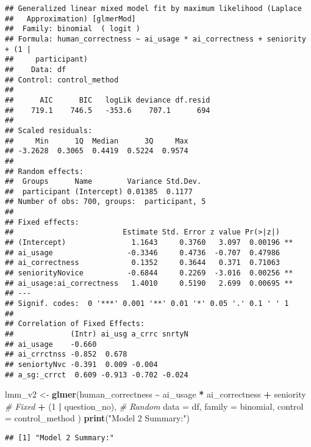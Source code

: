 \documentclass[
]{article}
\newenvironment{Shaded}{\begin{snugshade}}{\end{snugshade}}
\newcommand{\AttributeTok}[1]{\textcolor[rgb]{0.13,0.29,0.53}{#1}}
\newcommand{\CommentTok}[1]{\textcolor[rgb]{0.56,0.35,0.01}{\textit{#1}}}
\newcommand{\DecValTok}[1]{\textcolor[rgb]{0.00,0.00,0.81}{#1}}
\newcommand{\FunctionTok}[1]{\textcolor[rgb]{0.13,0.29,0.53}{\textbf{#1}}}
\newcommand{\NormalTok}[1]{#1}
\newcommand{\OtherTok}[1]{\textcolor[rgb]{0.56,0.35,0.01}{#1}}
\newcommand{\SpecialCharTok}[1]{\textcolor[rgb]{0.81,0.36,0.00}{\textbf{#1}}}
\newcommand{\StringTok}[1]{\textcolor[rgb]{0.31,0.60,0.02}{#1}}
\begin{document}
\begin{verbatim}
## Generalized linear mixed model fit by maximum likelihood (Laplace
##   Approximation) [glmerMod]
##  Family: binomial  ( logit )
## Formula: human_correctness ~ ai_usage * ai_correctness + seniority + (1 |  
##     participant)
##    Data: df
## Control: control_method
## 
##      AIC      BIC   logLik deviance df.resid 
##    719.1    746.5   -353.6    707.1      694 
## 
## Scaled residuals: 
##     Min      1Q  Median      3Q     Max 
## -3.2628  0.3065  0.4419  0.5224  0.9574 
## 
## Random effects:
##  Groups      Name        Variance Std.Dev.
##  participant (Intercept) 0.01385  0.1177  
## Number of obs: 700, groups:  participant, 5
## 
## Fixed effects:
##                         Estimate Std. Error z value Pr(>|z|)   
## (Intercept)               1.1643     0.3760   3.097  0.00196 **
## ai_usage                 -0.3346     0.4736  -0.707  0.47986   
## ai_correctness            0.1352     0.3644   0.371  0.71063   
## seniorityNovice          -0.6844     0.2269  -3.016  0.00256 **
## ai_usage:ai_correctness   1.4010     0.5190   2.699  0.00695 **
## ---
## Signif. codes:  0 '***' 0.001 '**' 0.01 '*' 0.05 '.' 0.1 ' ' 1
## 
## Correlation of Fixed Effects:
##             (Intr) ai_usg a_crrc snrtyN
## ai_usage    -0.660                     
## ai_crrctnss -0.852  0.678              
## seniortyNvc -0.391  0.009 -0.004       
## a_sg:_crrct  0.609 -0.913 -0.702 -0.024
\end{verbatim}

\begin{Shaded}
\begin{Highlighting}[]
\NormalTok{lmm\_v2 }\OtherTok{\textless{}{-}} \FunctionTok{glmer}\NormalTok{(human\_correctness }\SpecialCharTok{\textasciitilde{}}\NormalTok{ ai\_usage }\SpecialCharTok{*}\NormalTok{ ai\_correctness }\SpecialCharTok{+}\NormalTok{ seniority }\CommentTok{\# Fixed}
                \SpecialCharTok{+}\NormalTok{ (}\DecValTok{1} \SpecialCharTok{|}\NormalTok{ question\_no), }\CommentTok{\# Random}
                \AttributeTok{data =}\NormalTok{ df, }\AttributeTok{family =}\NormalTok{ binomial,}
                \AttributeTok{control =}\NormalTok{ control\_method}
\NormalTok{                )}
\FunctionTok{print}\NormalTok{(}\StringTok{"Model 2 Summary:"}\NormalTok{)}
\end{Highlighting}
\end{Shaded}

\begin{verbatim}
## [1] "Model 2 Summary:"
\end{verbatim}
\end{document}
